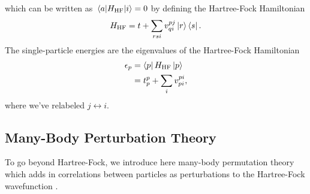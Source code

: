 \documentclass[10pt]{article}
\begin{document}
which can be written as $\mel{a}{H_{\text{HF}}}{i}=0$ by defining the Hartree-Fock Hamiltonian
\begin{align}
\label{hf_hamiltonian}
H_{\text{HF}}
=
t
+
\sum_{rsi}v^{pj}_{qi}\ket{r}\bra{s}.
\end{align}
The single-particle energies are the eigenvalues of the Hartree-Fock Hamiltonian
\begin{align}
\label{single_particle_energies}
\epsilon_p
&=
\bra{p}H_{\text{HF}}\ket{p}
\\
&=
t^p_p
+
\sum_{i}
v^{pi}_{pi},
\end{align}
where we've relabeled $j\leftrightarrow i$.

\subsection{Many-Body Perturbation Theory}

To go beyond Hartree-Fock, we introduce here many-body permutation theory which adds in correlations between particles as perturbations to the Hartree-Fock wavefunction \cite{morten_book}.
\end{document}
